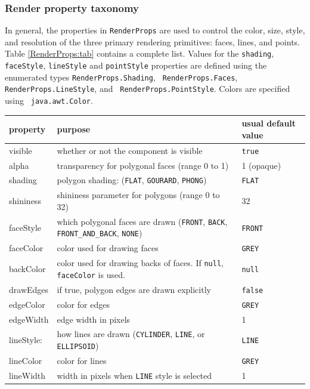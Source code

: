 \subsubsection{Render property taxonomy}

In general, the properties in {\tt RenderProps} are used to control
the color, size, style, and resolution of the three primary rendering
primitives: faces, lines, and points. Table \ref{RenderProps:tab}
contains a complete list. Values for the {\tt shading}, {\tt
faceStyle}, {\tt lineStyle} and {\tt pointStyle} properties are
defined using the enumerated types {\tt RenderProps.Shading}, {\tt
RenderProps.Faces}, {\tt RenderProps.LineStyle}, and {\tt
RenderProps.PointStyle}.  Colors are specified using {\tt
java.awt.Color}.

\begin{table}
\begin{center}
\begin{tabular}{|lll|}
\hline property & purpose & usual default value \\ \hline
visible & whether or not the component is visible & {\tt true} \\
alpha & transparency for polygonal faces (range 0 to 1) & 1 (opaque) \\
shading & polygon shading: ({\tt FLAT}, {\tt GOURARD}, {\tt PHONG}) & {\tt FLAT}\\
shininess & shininess parameter for polygons (range 0 to 32) & 32 \\
\hline
faceStyle &
which polygonal faces are drawn ({\tt FRONT}, {\tt BACK},
{\tt FRONT\_AND\_BACK}, {\tt NONE}) & {\tt FRONT} \\
faceColor &
color used for drawing faces & {\tt GREY} \\
backColor &
color used for drawing backs of faces. If {\tt null}, {\tt faceColor} is used. &
{\tt null} \\
drawEdges & if true, polygon edges are drawn explicitly & {\tt false} \\
\hline
edgeColor & color for edges & {\tt GREY} \\
edgeWidth & edge width in pixels & 1 \\
\hline
lineStyle: &
how lines are drawn ({\tt CYLINDER}, {\tt LINE}, or {\tt ELLIPSOID}) & 
{\tt LINE} \\
lineColor & color for lines & {\tt GREY} \\
lineWidth & width in pixels when {\tt LINE} style is selected & 1 \\

\end{tabular}
\end{center}
\end{table}
